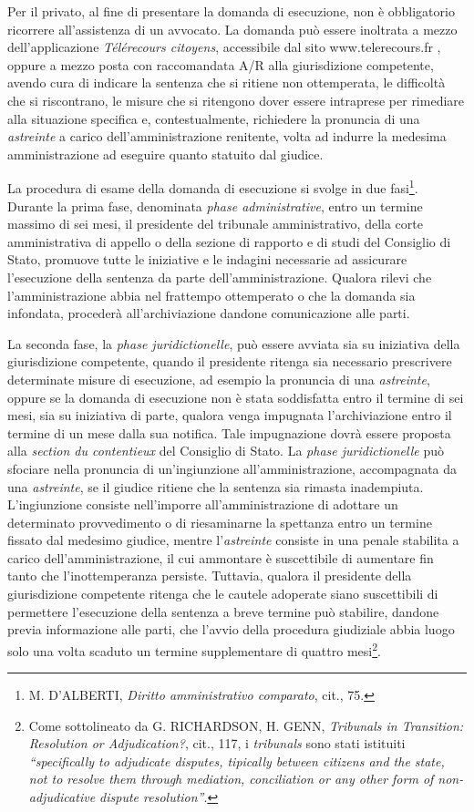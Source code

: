 \documentclass[12pt,it,a4paper,]{report}
\begin{document}
Per il privato, al fine di presentare la domanda di esecuzione, non è
obbligatorio ricorrere all'assistenza di un avvocato. La domanda può
essere inoltrata a mezzo dell'applicazione \emph{Télérecours citoyens},
accessibile dal sito www.telerecours.fr , oppure a mezzo posta con
raccomandata A/R alla giurisdizione competente, avendo cura di indicare
la sentenza che si ritiene non ottemperata, le difficoltà che si
riscontrano, le misure che si ritengono dover essere intraprese per
rimediare alla situazione specifica e, contestualmente, richiedere la
pronuncia di una \emph{astreinte} a carico dell'amministrazione
renitente, volta ad indurre la medesima amministrazione ad eseguire
quanto statuito dal giudice.

La procedura di esame della domanda di esecuzione si svolge in due
fasi\footnote{M. D'ALBERTI, \emph{Diritto amministrativo comparato},
  cit., 75.}. Durante la prima fase, denominata \emph{phase
administrative}, entro un termine massimo di sei mesi, il presidente del
tribunale amministrativo, della corte amministrativa di appello o della
sezione di rapporto e di studi del Consiglio di Stato, promuove tutte le
iniziative e le indagini necessarie ad assicurare l'esecuzione della
sentenza da parte dell'amministrazione. Qualora rilevi che
l'amministrazione abbia nel frattempo ottemperato o che la domanda sia
infondata, procederà all'archiviazione dandone comunicazione alle parti.

La seconda fase, la \emph{phase juridictionelle}, può essere avviata sia
su iniziativa della giurisdizione competente, quando il presidente
ritenga sia necessario prescrivere determinate misure di esecuzione, ad
esempio la pronuncia di una \emph{astreinte}, oppure se la domanda di
esecuzione non è stata soddisfatta entro il termine di sei mesi, sia su
iniziativa di parte, qualora venga impugnata l'archiviazione entro il
termine di un mese dalla sua notifica. Tale impugnazione dovrà essere
proposta alla \emph{section du contentieux} del Consiglio di Stato. La
\emph{phase juridictionelle} può sfociare nella pronuncia di
un'ingiunzione all'amministrazione, accompagnata da una
\emph{astreinte}, se il giudice ritiene che la sentenza sia rimasta
inadempiuta. L'ingiunzione consiste nell'imporre all'amministrazione di
adottare un determinato provvedimento o di riesaminarne la spettanza
entro un termine fissato dal medesimo giudice, mentre l'\emph{astreinte}
consiste in una penale stabilita a carico dell'amministrazione, il cui
ammontare è suscettibile di aumentare fin tanto che l'inottemperanza
persiste. Tuttavia, qualora il presidente della giurisdizione competente
ritenga che le cautele adoperate siano suscettibili di permettere
l'esecuzione della sentenza a breve termine può stabilire, dandone
previa informazione alle parti, che l'avvio della procedura giudiziale
abbia luogo solo una volta scaduto un termine supplementare di quattro
mesi\footnote{Come sottolineato da G. RICHARDSON, H. GENN,
  \emph{Tribunals in Transition: Resolution or Adjudication?}, cit.,
  117, i \emph{tribunals} sono stati istituiti \emph{``specifically to
  adjudicate disputes, tipically between citizens and the state, not to
  resolve them through mediation, conciliation or any other form of
  non-adjudicative dispute resolution''}.}.
\end{document}
